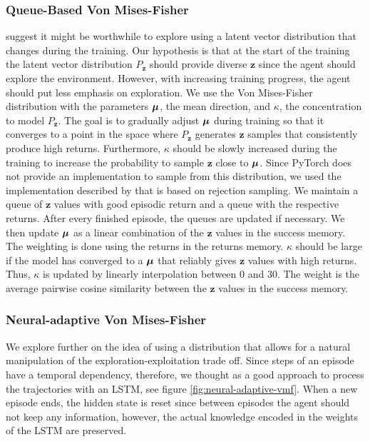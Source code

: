 \documentclass[10pt]{article} %
\begin{document}
\subsubsection{Queue-Based Von Mises-Fisher}
\cite{rle-paper} suggest it might be worthwhile to explore using a latent vector distribution that changes during the training. Our hypothesis is that at the start of the training the latent vector distribution $P_{\textbf{z}}$ should provide diverse $\textbf{z}$ since the agent should explore the environment. However, with increasing training progress, the agent should put less emphasis on exploration. We use the Von Mises-Fisher distribution with the parameters ${\bm{\mu}}$, the mean direction, and $\kappa$, the concentration to model $P_{\textbf{z}}$. The goal is to gradually adjust ${\bm{\mu}}$ during training so that it converges to a point in the space where $P_{\textbf{z}}$ generates $\mathbf{z}$ samples that consistently produce high returns. Furthermore, $\kappa$ should be slowly increased during the training to increase the probability to sample $\mathbf{z}$ close to ${\bm{\mu}}$. Since PyTorch does not provide an implementation to sample from this distribution, we used the implementation described by \cite{von-mises-fisher-paper} that is based on rejection sampling. We maintain a queue of $\textbf{z}$ values with good episodic return and a queue with the respective returns. After every finished episode, the queues are updated if necessary. We then update ${\bm{\mu}}$ as a linear combination of the $\textbf{z}$ values in the success memory. The weighting is done using the returns in the returns memory. $\kappa$ should be large if the model has converged to a ${\bm{\mu}}$ that reliably gives $\textbf{z}$ values with high returns. Thus, $\kappa$ is updated by linearly interpolation between 0 and 30. The weight is the average pairwise cosine similarity between the $\textbf{z}$ values in the success memory.

\vspace{-1pt}
\subsubsection{Neural-adaptive Von Mises-Fisher}

We explore further on the idea of using a distribution that allows for a natural manipulation of the exploration-exploitation trade off. Since steps of an episode have a temporal dependency, therefore, we thought as a good approach to process the trajectories with an LSTM, see figure \ref{fig:neural-adaptive-vmf}. When a new episode ends, the hidden state is reset since between episodes the agent should not keep any information, however, the actual knowledge encoded in the weights of the LSTM are preserved. 
\end{document}
